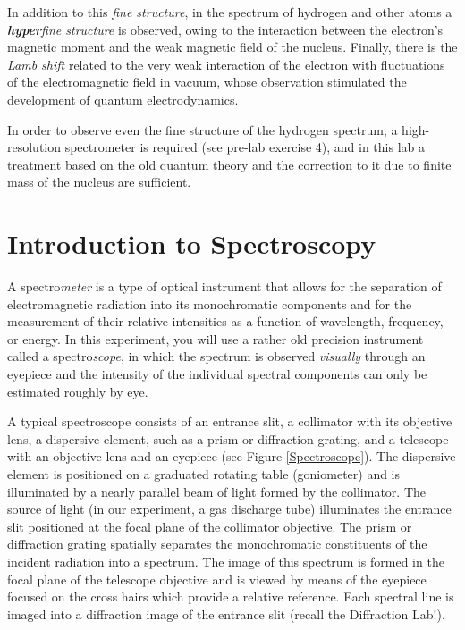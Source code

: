 \documentclass[12pt]{article}
\begin{document}
In addition to this \textit{fine structure}, in the spectrum of hydrogen and other atoms a \textit{\textbf{hyper}fine structure} is observed, owing to the interaction between the electron's magnetic moment and the weak magnetic field of the nucleus. Finally, there is the \textit{Lamb shift} related to the very weak interaction of the electron with fluctuations of the electromagnetic field in vacuum, whose observation stimulated the development of quantum electrodynamics.

In order to observe even the fine structure of the hydrogen spectrum, a high-resolution spectrometer is required (see pre-lab exercise 4), and in this lab a treatment based on the old quantum theory and the correction to it due to finite mass of the nucleus are sufficient.

\section{Introduction to Spectroscopy}

A spectro\textit{meter} is a type of optical instrument that allows for the separation of electromagnetic radiation into its monochromatic components and for the measurement of their relative intensities as a function of wavelength, frequency, or energy. In this experiment, you will use a rather old precision instrument called a spectro\textit{scope}, in which the spectrum is observed \textit{visually} through an eyepiece and the intensity of the individual spectral components can only be estimated roughly by eye. 

A typical spectroscope consists of an entrance slit, a collimator with its objective lens, a dispersive element, such as a prism or diffraction grating, and a telescope with an objective lens and an eyepiece (see Figure \ref{Spectroscope}). The dispersive element is positioned on a graduated rotating table (goniometer) and is illuminated by a nearly parallel beam of light formed by the collimator. The source of light (in our experiment, a gas discharge tube) illuminates the entrance slit positioned at the focal plane of the collimator objective. The prism or diffraction grating spatially separates the monochromatic constituents of the incident radiation into a spectrum. The image of this spectrum is formed in the focal plane of the telescope objective and is viewed by means of the eyepiece focused on the cross hairs which provide a relative reference. Each spectral line is imaged into a diffraction image of the entrance slit (recall the Diffraction Lab!).
\end{document}
